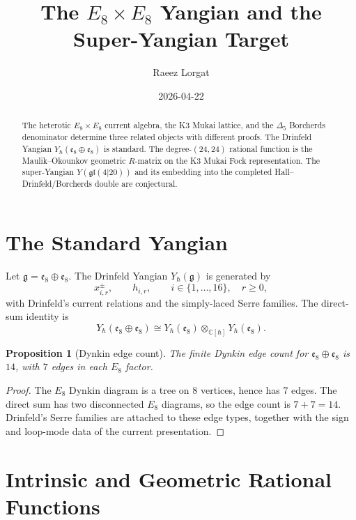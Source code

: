 \documentclass[11pt]{article}
\title{The \(E_8\times E_8\) Yangian and the Super-Yangian Target}
\author{Raeez Lorgat}
\date{2026-04-22}
\newtheorem{proposition}[theorem]{Proposition}
\providecommand{\C}{\mathbb{C}}
\begin{document}
\maketitle

\begin{abstract}
The heterotic \(E_8\times E_8\) current algebra, the K3 Mukai lattice,
and the \(\Delta_5\) Borcherds denominator determine three related
objects with different proofs.  The Drinfeld Yangian
\(Y_\hbar(\mathfrak e_8\oplus\mathfrak e_8)\) is standard.  The
degree-\((24,24)\) rational function is the Maulik--Okounkov geometric
\(R\)-matrix on the K3 Mukai Fock representation.  The super-Yangian
\(Y(\mathfrak{gl}(4|20))\) and its embedding into the completed
Hall--Drinfeld/Borcherds double are conjectural.
\end{abstract}

\tableofcontents

\section{The Standard Yangian}
\label{sec:e8-standard-yangian}

Let \(\mathfrak g=\mathfrak e_8\oplus\mathfrak e_8\).  The Drinfeld
Yangian \(Y_\hbar(\mathfrak g)\) is generated by
\[
  x^{\pm}_{i,r},\qquad h_{i,r},\qquad
  i\in\{1,\ldots,16\},\quad r\geq0,
\]
with Drinfeld's current relations and the simply-laced Serre families.
The direct-sum identity is
\[
  Y_\hbar(\mathfrak e_8\oplus\mathfrak e_8)
  \cong
  Y_\hbar(\mathfrak e_8)\otimes_{\C[\hbar]}
  Y_\hbar(\mathfrak e_8).
\]

\begin{proposition}[Dynkin edge count]
\label{prop:e8-edge-count}
The finite Dynkin edge count for
\(\mathfrak e_8\oplus\mathfrak e_8\) is \(14\), with \(7\) edges in
each \(E_8\) factor.
\end{proposition}

\begin{proof}
The \(E_8\) Dynkin diagram is a tree on \(8\) vertices, hence has
\(7\) edges.  The direct sum has two disconnected \(E_8\) diagrams, so
the edge count is \(7+7=14\).  Drinfeld's Serre families are attached to
these edge types, together with the sign and loop-mode data of the
current presentation.
\end{proof}

\section{Intrinsic and Geometric Rational Functions}
\label{sec:intrinsic-geometric}
\end{document}

